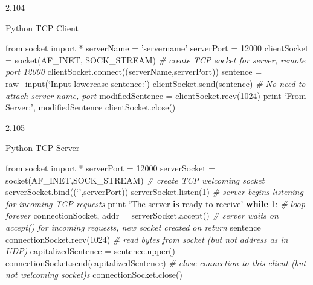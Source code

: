 \documentclass[
]{article}
\newenvironment{Shaded}{}{}
\newcommand{\BuiltInTok}[1]{#1}
\newcommand{\CommentTok}[1]{\textcolor[rgb]{0.38,0.63,0.69}{\textit{#1}}}
\newcommand{\ControlFlowTok}[1]{\textcolor[rgb]{0.00,0.44,0.13}{\textbf{#1}}}
\newcommand{\DecValTok}[1]{\textcolor[rgb]{0.25,0.63,0.44}{#1}}
\newcommand{\ExtensionTok}[1]{#1}
\newcommand{\ImportTok}[1]{#1}
\newcommand{\KeywordTok}[1]{\textcolor[rgb]{0.00,0.44,0.13}{\textbf{#1}}}
\newcommand{\NormalTok}[1]{#1}
\newcommand{\OperatorTok}[1]{\textcolor[rgb]{0.40,0.40,0.40}{#1}}
\begin{document}
2.104

Python TCP Client

\begin{Shaded}
\begin{Highlighting}[]
\ImportTok{from}\NormalTok{ socket }\ImportTok{import} \OperatorTok{*}
\NormalTok{serverName }\OperatorTok{=}\NormalTok{ ’servername’}
\NormalTok{serverPort }\OperatorTok{=} \DecValTok{12000}
\NormalTok{clientSocket }\OperatorTok{=}\NormalTok{ socket(AF\_INET, SOCK\_STREAM)}
\CommentTok{\# create TCP socket for server, remote port 12000}
\NormalTok{clientSocket.}\ExtensionTok{connect}\NormalTok{((serverName,serverPort))}
\NormalTok{sentence }\OperatorTok{=} \BuiltInTok{raw\_input}\NormalTok{(‘Input lowercase sentence:’)}
\NormalTok{clientSocket.send(sentence)}
\CommentTok{\# No need to attach server name, port }
\NormalTok{modifiedSentence }\OperatorTok{=}\NormalTok{ clientSocket.recv(}\DecValTok{1024}\NormalTok{)}
\BuiltInTok{print}\NormalTok{ ‘From Server:’, modifiedSentence}
\NormalTok{clientSocket.close()}

\end{Highlighting}
\end{Shaded}

2.105

Python TCP Server

\begin{Shaded}
\begin{Highlighting}[]
 \ImportTok{from}\NormalTok{ socket }\ImportTok{import} \OperatorTok{*}
\NormalTok{serverPort }\OperatorTok{=} \DecValTok{12000}
\NormalTok{serverSocket }\OperatorTok{=}\NormalTok{ socket(AF\_INET,SOCK\_STREAM)}
\CommentTok{\# create TCP welcoming socket}
\NormalTok{serverSocket.bind((‘’,serverPort))}
\NormalTok{serverSocket.listen(}\DecValTok{1}\NormalTok{)}
\CommentTok{\# server begins listening for  incoming TCP requests}
\BuiltInTok{print}\NormalTok{ ‘The server }\KeywordTok{is}\NormalTok{ ready to receive’}
\ControlFlowTok{while} \DecValTok{1}\NormalTok{:}
\CommentTok{\# loop forever}
\NormalTok{     connectionSocket, addr }\OperatorTok{=}\NormalTok{ serverSocket.accept()}
     \CommentTok{\# server waits on accept() for incoming requests, new socket created on return}
\NormalTok{     sentence }\OperatorTok{=}\NormalTok{ connectionSocket.recv(}\DecValTok{1024}\NormalTok{)}
     \CommentTok{\# read bytes from socket (but not address as in UDP)}
\NormalTok{     capitalizedSentence }\OperatorTok{=}\NormalTok{ sentence.upper()}
\NormalTok{     connectionSocket.send(capitalizedSentence)}
     \CommentTok{\# close connection to this client (but not welcoming socket)s}
\NormalTok{     connectionSocket.close()}

\end{Highlighting}
\end{Shaded}
\end{document}
